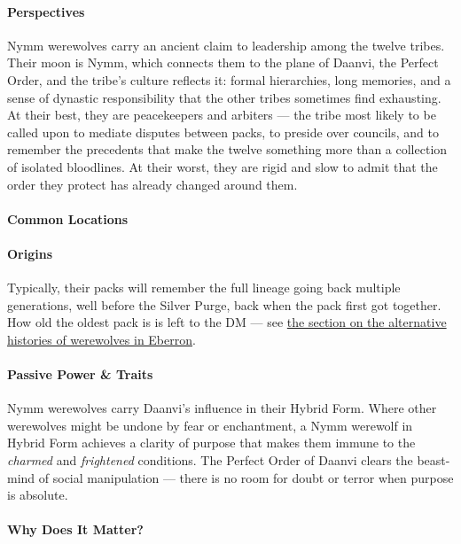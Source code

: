 \documentclass[twocolumn]{dndbook}
\begin{document}
\paragraph*{Perspectives} Nymm werewolves carry an ancient claim to leadership among the twelve tribes.
Their moon is Nymm, which connects them to the plane of Daanvi, the Perfect Order, and the tribe's culture reflects it: formal hierarchies, long memories, and a sense of dynastic responsibility that the other tribes sometimes find exhausting.
At their best, they are peacekeepers and arbiters --- the tribe most likely to be called upon to mediate disputes between packs, to preside over councils, and to remember the precedents that make the twelve something more than a collection of isolated bloodlines.
At their worst, they are rigid and slow to admit that the order they protect has already changed around them.\par

\paragraph*{Common Locations}

\paragraph*{Origins} Typically, their packs will remember the full lineage going back multiple generations, well before the Silver Purge, back when the pack first got together.
How old the oldest pack is is left to the DM --- see \hyperref[sec:history]{the section on the alternative histories of werewolves in Eberron}.

\paragraph*{Passive Power \& Traits} Nymm werewolves carry Daanvi's influence in their Hybrid Form.
Where other werewolves might be undone by fear or enchantment, a Nymm werewolf in Hybrid Form achieves a clarity of purpose that makes them immune to the \emph{charmed} and \emph{frightened} conditions.
The Perfect Order of Daanvi clears the beast-mind of social manipulation --- there is no room for doubt or terror when purpose is absolute.\par

\paragraph*{Why Does It Matter?}
\end{document}
